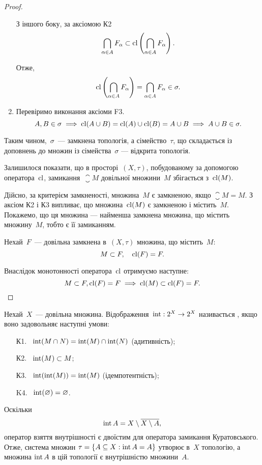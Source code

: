 \begin{proof}
\begin{enumerate}
З іншого боку, за аксіомою К2 \[ \bigcap_{\alpha \in A} F_\alpha \subset \operatorname{cl} \left(\bigcap_{\alpha \in A} F_\alpha \right). \]

Отже, \[ \operatorname{cl} \left(\bigcap_{\alpha \in A} F_\alpha \right) = \bigcap_{\alpha \in A} F_\alpha \in \sigma. \]

\item Перевіримо виконання аксіоми F3. \[A, B \in \sigma \implies \operatorname{cl}(A\cup B) = \operatorname{cl}(A)\cup \operatorname{cl}(B) = A\cup B \implies A\cup B\in\sigma.\]
\end{enumerate}

Таким чином,~$\sigma$~--- замкнена топологія, а сімейство~$\tau$, що
складається із доповнень до множин із сімейства~$\sigma$ ---
відкрита топологія.

Залишилося показати, що в просторі~$(X, \tau)$, побудованому
за допомогою оператора~$\operatorname{cl}$, замикання~$\closure{M}$ довільної
множини~$M$ збігається з~$\operatorname{cl}(M)$.

Дійсно, за критерієм замкненості, множина~$M$ є замкненою, якщо
$\closure{M} = M$. З аксіом К2 і К3 випливає, що множина~$\operatorname{cl}(M)$ є
замкненою і містить~$M$. Покажемо, що ця множина ---
найменша замкнена множина, що містить множину~$M$,
тобто є її замиканням.

Нехай~$F$~--- довільна замкнена в~$(X, \tau)$ множина, що
містить~$M$: \[ M \subset F, \quad \operatorname{cl}(F) = F. \]

Внаслідок монотонності оператора~$\operatorname{cl}$ отримуємо
наступне: \[ M \subset F, \operatorname{cl}(F) = F \implies \operatorname{cl}(M) \subset \operatorname{cl}(F) = F. \qedhere \]
\end{proof}

\begin{definition}
Нехай~$X$~--- довільна множина. Відображення~$\operatorname{int}: 2^X \to 2^X$ називається , якщо воно задовольняє
наступні умови:
\begin{enumerate}
\item[К1.]~$\operatorname{int}(M \cap N) = \operatorname{int}(M)\cap \operatorname{int}(N)$ (адитивність);
\item[К2.]~$\operatorname{int}(M) \subset M$;
\item[К3.]~$\operatorname{int}(\operatorname{int}(M)) = \operatorname{int}(M)$ (ідемпотентність);
\item[K4.]~$\operatorname{int}(\varnothing) = \varnothing$.
\end{enumerate}
\end{definition}

\begin{corollary}
Оскільки \[\operatorname{int} A = X \setminus \overline{X \setminus A}, \]
оператор взяття внутрішності є двоїстим для оператора
замикання Куратовського. Отже, система множин
$\tau = \{A \subseteq X: \operatorname{int} A = A\}$ утворює в~$X$ топологію, а множина
$\operatorname{int} A$ в цій топології є внутрішністю множини~$A$.
\end{corollary}

